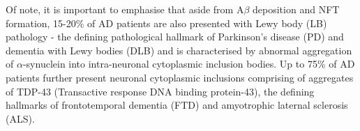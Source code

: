 Of note, it is important to emphasise that aside from A$\beta$ deposition and NFT formation, 15-20\% of AD patients are also presented with  Lewy body (LB) pathology \cite{C1995,L2003} - the defining pathological hallmark of Parkinson's disease (PD)\cite{Wakabayashi2007} and dementia with Lewy bodies (DLB)\cite{Spillantini1997} and is characterised by abnormal aggregation of $\alpha$-synuclein into intra-neuronal cytoplasmic inclusion bodies. Up to 75\% of AD patients further present neuronal cytoplasmic inclusions comprising of aggregates of TDP-43 \cite{King2010,McAleese2017,Arai2009} (Transactive response DNA binding protein-43), the defining hallmarks of frontotemporal dementia (FTD) and amyotrophic laternal sclerosis\cite{Pesiridis2009} (ALS).

